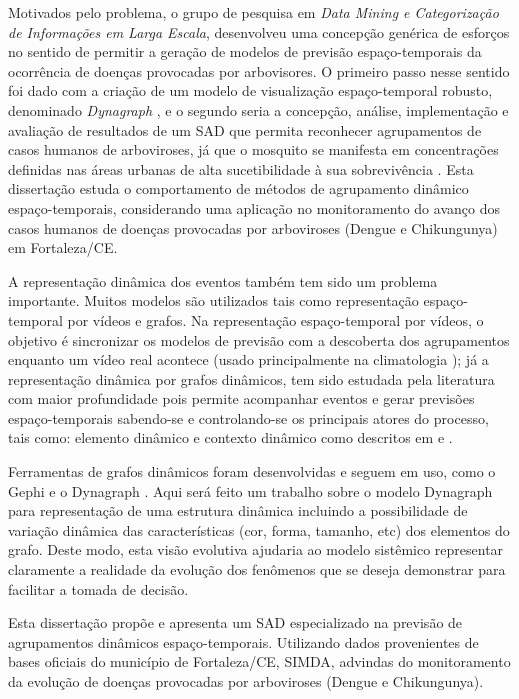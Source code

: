 Motivados pelo problema, o grupo de pesquisa em \textit{Data Mining e Categorização de Informações em Larga Escala}, desenvolveu uma concepção genérica de esforços no sentido de permitir a geração de modelos de previsão espaço-temporais da ocorrência de doenças provocadas por arbovisores. O primeiro passo nesse sentido foi dado com a criação de um modelo de visualização espaço-temporal robusto, denominado \emph{Dynagraph} \cite{dynagraph}, e o segundo seria a concepção, análise, implementação e avaliação de resultados de um \acrfull{SAD} que permita reconhecer agrupamentos de casos humanos de arboviroses, já que o mosquito se manifesta em concentrações definidas nas áreas urbanas de alta sucetibilidade à sua sobrevivência \cite{comportamentoDengue}.
Esta dissertação estuda o comportamento de métodos de agrupamento dinâmico espaço-temporais, considerando uma aplicação no monitoramento do avanço dos casos humanos de doenças provocadas por arboviroses (Dengue e Chikungunya) em Fortaleza/CE.

A representação dinâmica dos eventos também tem sido um problema importante. Muitos modelos são utilizados tais como representação espaço-temporal por vídeos e grafos. Na representação espaço-temporal por vídeos, o objetivo é sincronizar os modelos de previsão com a descoberta dos agrupamentos enquanto um vídeo real acontece (usado principalmente na climatologia \cite{faghmous2013}); já a representação dinâmica por grafos dinâmicos, tem sido estudada pela literatura com maior profundidade pois permite acompanhar eventos e gerar previsões espaço-temporais sabendo-se e controlando-se os principais atores do processo, tais como: elemento dinâmico e contexto dinâmico como descritos em \cite{holme:predictability} e \cite{Mitsa:2010}.

Ferramentas de grafos dinâmicos foram desenvolvidas e seguem em uso, como o Gephi \cite{gephi} e o Dynagraph \cite{dynagraph}. Aqui será feito um trabalho sobre o modelo Dynagraph para representação de uma estrutura dinâmica incluindo a possibilidade de variação dinâmica das características (cor, forma, tamanho, etc) dos elementos do grafo. Deste modo, esta visão evolutiva ajudaria ao modelo sistêmico representar claramente a realidade da evolução dos fenômenos que se deseja demonstrar para facilitar a tomada de decisão.


Esta dissertação propõe e apresenta um \acrshort{SAD} especializado na previsão de agrupamentos dinâmicos espaço-temporais. Utilizando dados provenientes de bases oficiais do município de Fortaleza/CE, \acrfull{SIMDA}, advindas do monitoramento da evolução de doenças provocadas por arboviroses (Dengue e Chikungunya). 

